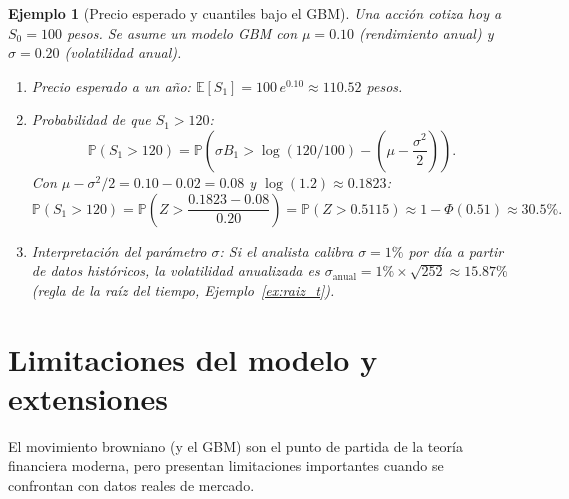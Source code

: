 \documentclass[12pt]{book}
\newtheorem{example}{Ejemplo}[chapter]
\begin{document}
\begin{example}[Precio esperado y cuantiles bajo el GBM]
Una acción cotiza hoy a $S_0 = 100$ pesos. Se asume un modelo GBM con $\mu = 0.10$ (rendimiento anual) y $\sigma = 0.20$ (volatilidad anual).

\begin{enumerate}
    \item[\normalfont(a)] \textit{Precio esperado a un año:} $\mathbb{E}[S_1] = 100\,e^{0.10} \approx 110.52$ pesos.

    \item[\normalfont(b)] \textit{Probabilidad de que $S_1 > 120$:}
    \[
        \mathbb{P}(S_1 > 120) = \mathbb{P}\!\left(\sigma B_1 > \log(120/100) - \left(\mu - \frac{\sigma^2}{2}\right)\right).
    \]
    Con $\mu - \sigma^2/2 = 0.10 - 0.02 = 0.08$ y $\log(1.2) \approx 0.1823$:
    \[
        \mathbb{P}(S_1 > 120) = \mathbb{P}\!\left(Z > \frac{0.1823 - 0.08}{0.20}\right) = \mathbb{P}(Z > 0.5115) \approx 1 - \Phi(0.51) \approx 30.5\%.
    \]

    \item[\normalfont(c)] \textit{Interpretación del parámetro $\sigma$:} Si el analista calibra $\sigma = 1\%$ por día a partir de datos históricos, la volatilidad anualizada es $\sigma_{\text{anual}} = 1\% \times \sqrt{252} \approx 15.87\%$ (regla de la raíz del tiempo, Ejemplo~\ref{ex:raiz_t}).
\end{enumerate}
\end{example}

\section{Limitaciones del modelo y extensiones}

El movimiento browniano (y el GBM) son el punto de partida de la teoría financiera moderna, pero presentan limitaciones importantes cuando se confrontan con datos reales de mercado.
\end{document}
